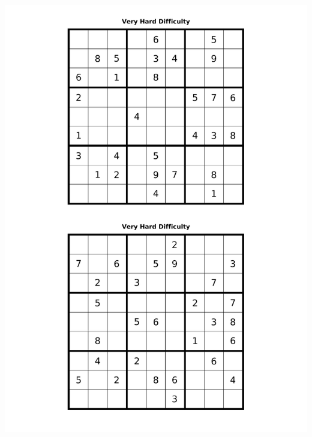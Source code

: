 \documentclass[10pt,a4paper,twoside]{report}
\begin{document}
\vspace{\fill}
\includegraphics[height=24cm]{veryhard.pdf}
\vspace{\fill}

\clearpage


\end{document}
